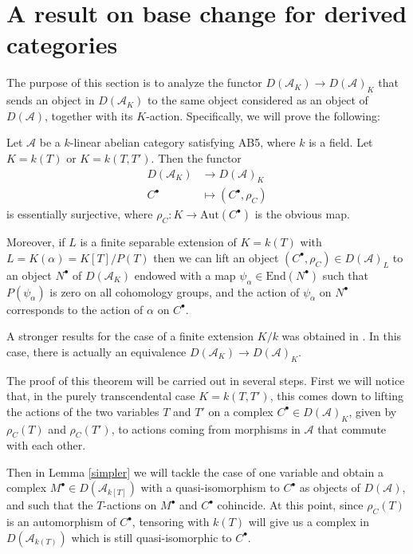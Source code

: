 \documentclass{amsart}
\begin{document}
\section{A result on base change for derived categories}\label{base change section}

The purpose of this section is to analyze the functor $D(\mathcal{A}_{K}) {\rightarrow} D(\mathcal{A})_{K}$ that sends an object in $D(\mathcal{A}_{K})$ to the same object considered as an object of $D(\mathcal{A})$, together with its $K$-action. Specifically, we will prove the following:

\begin{theorem}\label{ess-sur}
Let $\mathcal{A}$ be a $k$-linear abelian category satisfying AB5, where $k$ is a field. Let $K=k(T)$ or $K=k(T,T')$. Then the functor
\begin{align*}
D(\mathcal{A}_{K}) &{\rightarrow} D(\mathcal{A})_{K}\\
C^{\bullet} &\mapsto (C^{\bullet},\rho_{C})
\end{align*}
is essentially surjective, where $\rho_{C}:K\to \mathrm{Aut}(C^{\bullet})$ is the obvious map.

Moreover, if $L$ is a finite separable extension of $K=k(T)$ with $L=K(\alpha)=K[T]/P(T)$ then we can lift an object $(C^{\bullet}, \rho_{C})\in D(\mathscr{A})_{L}$ to an object $N^{\bullet}$ of $D(\mathscr{A}_{K})$ endowed with a map $\psi_{\alpha}\in \mathrm{End}(N^{\bullet})$ such that $P(\psi_{\alpha})$ is zero on all cohomology groups, and the action of $\psi_{\alpha}$ on $N^{\bullet}$ corresponds to the action of $\alpha$ on $C^{\bullet}$.
\end{theorem}

A stronger results for the case of a finite extension $K/k$ was obtained in \cite{Pawel}. In this case, there is actually an equivalence $D(\mathcal{A}_{K}) \to D(\mathcal{A})_{K}$.

The proof of this theorem will be carried out in several steps. First we will notice that, in the purely transcendental case $K=k(T,T')$, this comes down to lifting the actions of the two variables $T$ and $T'$ on a complex $C^{\bullet}\in D(\mathcal{A})_{K}$, given by $\rho_{C}(T)$ and $\rho_{C}(T')$,  to actions coming from morphisms in $\mathcal{A}$ that commute with each other. 

Then in Lemma \ref{simpler} we will tackle the case of one variable and obtain a complex $M^{\bullet}\in D(\mathcal{A}_{k[T]})$ with a quasi-isomorphism to $C^{\bullet}$ as objects of $D(\mathcal{A})$, and such that the $T$-actions on $M^{\bullet}$ and $C^{\bullet}$ cohincide. At this point, since $\rho_{C}(T)$ is an automorphism of $C^{\bullet}$, tensoring with $k(T)$ will give us a complex in $D(\mathcal{A}_{k(T)})$ which is still quasi-isomorphic to $C^{\bullet}$.
\end{document}
